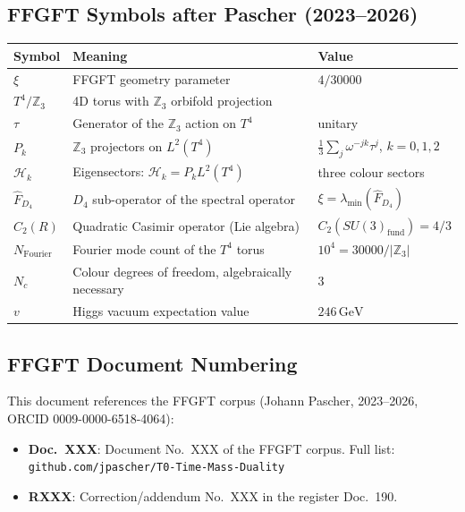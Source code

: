 \subsection*{FFGFT Symbols after Pascher (2023--2026)}

\begin{center}
\begin{tabular}{lll}
\toprule
Symbol & Meaning & Value \\
\midrule
$\xi$ & FFGFT geometry parameter & $4/30000$ \\
$T^4/\mathbb{Z}_3$ & 4D torus with $\mathbb{Z}_3$ orbifold projection & \\
$\tau$ & Generator of the $\mathbb{Z}_3$ action on $T^4$ & unitary \\
$P_k$ & $\mathbb{Z}_3$ projectors on $L^2(T^4)$ &
  $\frac{1}{3}\sum_j\omega^{-jk}\tau^j$, $k=0,1,2$ \\
$\mathcal{H}_k$ & Eigensectors: $\mathcal{H}_k = P_k L^2(T^4)$ &
  three colour sectors \\
$\hat{F}_{D_4}$ & $D_4$ sub-operator of the spectral operator &
  $\xi = \lambda_{\min}(\hat{F}_{D_4})$ \\
$C_2(R)$ & Quadratic Casimir operator (Lie algebra) &
  $C_2(SU(3)_{\text{fund}}) = 4/3$ \\
$N_{\text{Fourier}}$ & Fourier mode count of the $T^4$ torus &
  $10^4 = 30000/|\mathbb{Z}_3|$ \\
$N_c$ & Colour degrees of freedom, algebraically necessary & $3$ \\
$v$ & Higgs vacuum expectation value & $246\,\text{GeV}$ \\
\bottomrule
\end{tabular}
\end{center}

\subsection*{FFGFT Document Numbering}

This document references the FFGFT corpus (Johann Pascher,
2023--2026, ORCID 0009-0000-6518-4064):
\begin{itemize}
  \item \textbf{Doc.~XXX}: Document No.~XXX of the FFGFT corpus.
    Full list: \texttt{github.com/jpascher/T0-Time-Mass-Duality}
  \item \textbf{RXXX}: Correction/addendum No.~XXX in the register Doc.~190.
\end{itemize}


